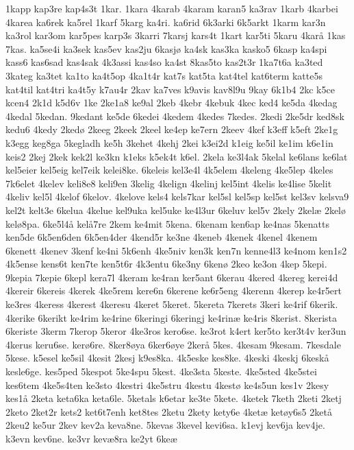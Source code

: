 1kapp
kap3re
kap4s3t
1kar.
1kara
4karab
4karam
karan5
ka3rav
1karb
4karbei
4karea
ka6rek
ka5rel
1karf
5karg
ka4ri.
ka6rid
6k3arki
6k5arkt
1karm
kar3n
ka3rol
kar3om
kar5pes
karp3s
3karri
7karsj
kars4t
1kart
kar5ti
5karu
4kar^^e5
1kas
7kas.
ka5se4i
ka3sek
kas5ev
kas2ju
6kasj^^f8
ka4sk
kas3ka
kasko5
6kasp
ka4spi
kass6
kas6sad
kas4sak
4k3assi
kas4so
ka4st
8kas5to
kas2t3r
1ka7t6a
ka3ted
3kateg
ka3tet
ka1to
ka4t5op
4ka1t4r
kat7s
kat5ta
kat4tel
kat6term
katte5s
kat4til
kat4tri
ka4t5y
k7au4r
2kav
ka7ves
k9avis
kav8l9u
9kay
6k1b4
2kc
k5ce
kcen4
2k1d
k5d6v
1ke
2ke1a8
ke9al
2keb
4kebr
4kebuk
4kec
ked4
ke5da
4kedag
4kedal
5kedan.
9kedant
ke5de
6kedei
4kedem
4kedes
7kedes.
2kedi
2ke5dr
ked8sk
kedu6
4kedy
2ked^^f8
2keeg
2keek
2keel
ke4ep
ke7ern
2keev
4kef
k3eff
k5eft
2ke1g
k3egg
keg8ga
5kegladh
ke5h
3kehet
4kehj
2kei
k3ei2d
k1eig
ke5il
ke1im
k6e1in
keis2
2kej
2kek
kek2l
ke3kn
k1eks
k5ek4t
k6el.
2kela
ke3l4ak
5kelal
ke6lans
ke6lat
kel5eier
kel5eig
kel7eik
kelei8ke.
6keleis
kel3e4l
4k5elem
4keleng
4ke5lep
4keles
7k6elet
4kelev
keli8e8
keli9en
3kelig
4kelign
4kelinj
kel5int
4kelis
ke4lise
5kelit
4keliv
kel5l
4kelof
6kelov.
4kelove
kels4
kels7kar
kel5sl
kel5sp
kel5st
kel3sv
kelsva9
kel2t
kelt3e
6kelua
4kelue
kel9uka
kel5uke
ke4l3ur
6keluv
kel5v
2kely
2kel^^e6
2kel^^f8
kel^^f88pa.
6ke5l4^^e5
kel^^e57re
2kem
ke4mit
5kena.
6kenam
ken6ap
ke4nas
5kenatts
ken5de
6k5en6den
6k5en4der
4kend5r
ke3ne
4keneb
4kenek
4kenel
4kenem
6kenett
4kenev
3kenf
ke4ni
5k6enh
4ke5niv
ken3k
ken7n
kenne4l3
ke4nom
ken1s2
4k5ense
kens6t
ken7te
ken5t6r
4k3entu
6ke3ny
6ken^^f8
2keo
ke3on
4kep
5kepi.
9kepia
7kepie
6kepl
kera7l
4keram
ke4ran
ker5ant
6kerau
4kered
4kereg
kerei4d
4kereir
6kereis
4kerek
4ke5rem
kere6n
6kerene
ke6r5eng
4kerenn
4kerep
ke4r5ert
ke3res
4keress
4kerest
4keresu
4keret
5keret.
5kereta
7kerets
3keri
ke4rif
6kerik.
4kerike
6kerikt
ke4rim
ke4rine
6keringi
6keringj
ke4rin^^e6
ke4ris
8kerist.
8kerista
6keriste
3kerm
7kerop
5keror
4ke3ros
kero6se.
ke3rot
k4ert
ker5to
ker3t4v
ker3un
4kerus
keru6se.
ker^^f86re.
8ker8^^f8ya
6ker6^^f8ye
2ker^^e5
5kes.
4kesam
9kesam.
7kesdale
5kese.
k5esel
ke5sil
4kesit
2kesj
k9es8ka.
4k5eske
kes8ke.
4keski
4keskj
6kesk^^e5
kesle6ge.
kes5ped
5kespot
5ke4spu
5kest.
4ke3sta
5keste.
4ke5sted
4ke5stei
kes6tem
4ke5s4ten
ke3sto
4kestri
4ke5stru
4kestu
4kest^^f8
ke4s5un
kes1v
2kesy
kes1^^e5
2keta
keta6ka
keta6le.
5ketals
k6etar
ke3te
5kete.
4ketek
7keth
2keti
2ketj
2keto
2ket2r
kets2
ket6t7enh
ket8tes
2ketu
2kety
kety6e
4ket^^e6
ket^^f8y6s5
2ket^^e5
2keu2
ke5ur
2kev
kev2a
keva8ne.
5kevas
3kevel
kevi6sa.
k1evj
kev6ja
kev4je.
k3evn
kev6ne.
ke3vr
kev^^e68ra
ke2yt
6ke^^e6
